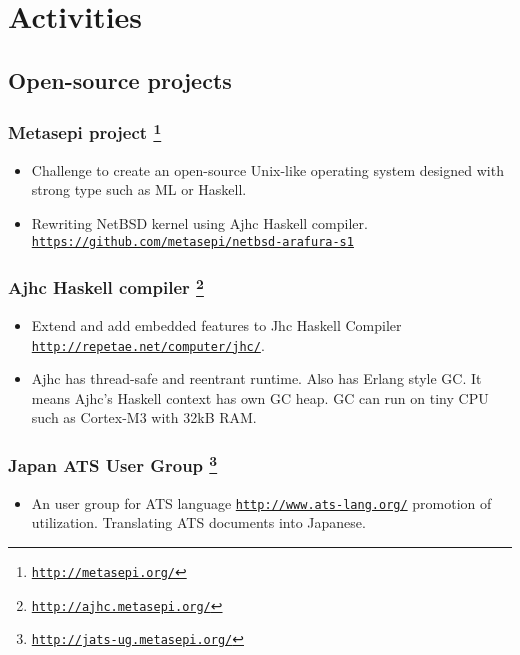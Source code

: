 \documentclass[letterpaper]{article}
\begin{document}
\section*{Activities}

\subsection*{Open-source projects}

\subsubsection*{Metasepi project \footnote{\href{http://metasepi.org/}{\tt http://metasepi.org/}}}
\begin{itemize}
\item Challenge to create an open-source Unix-like operating system designed with strong type such as ML or Haskell.
\item Rewriting NetBSD kernel using Ajhc Haskell compiler. \href{https://github.com/metasepi/netbsd-arafura-s1}{\tt https://github.com/metasepi/netbsd-arafura-s1}
\end{itemize}

\subsubsection*{Ajhc Haskell compiler \footnote{\href{http://ajhc.metasepi.org/}{\tt http://ajhc.metasepi.org/}}}
\begin{itemize}
\item Extend and add embedded features to Jhc Haskell Compiler \href{http://repetae.net/computer/jhc/}{\tt http://repetae.net/computer/jhc/}.
\item Ajhc has thread-safe and reentrant runtime. Also has Erlang style GC. It means Ajhc's Haskell context has own GC heap. GC can run on tiny CPU such as Cortex-M3 with 32kB RAM.
\end{itemize}

\subsubsection*{Japan ATS User Group \footnote{\href{http://jats-ug.metasepi.org/}{\tt http://jats-ug.metasepi.org/}}}
\begin{itemize}
\item An user group for ATS language \href{http://www.ats-lang.org/}{\tt http://www.ats-lang.org/} promotion of utilization. Translating ATS documents into Japanese.
\end{itemize}
\end{document}
